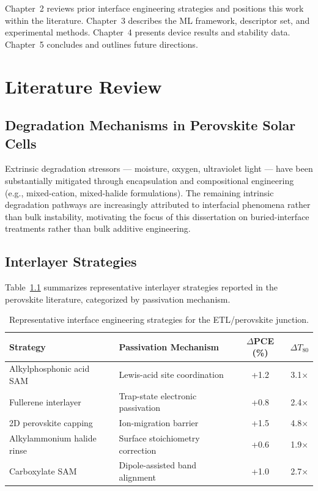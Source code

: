 \documentclass[12pt,a4paper,oneside]{report}
\begin{document}
Chapter~2 reviews prior interface engineering strategies and positions this
work within the literature. Chapter~3 describes the ML framework,
descriptor set, and experimental methods. Chapter~4 presents device results
and stability data. Chapter~5 concludes and outlines future directions.

\chapter{Literature Review}

\section{Degradation Mechanisms in Perovskite Solar Cells}

Extrinsic degradation stressors --- moisture, oxygen, ultraviolet light ---
have been substantially mitigated through encapsulation and compositional
engineering (e.g., mixed-cation, mixed-halide formulations). The remaining
intrinsic degradation pathways are increasingly attributed to interfacial
phenomena rather than bulk instability, motivating the focus of this
dissertation on buried-interface treatments rather than bulk additive
engineering.

\section{Interlayer Strategies}

Table~\ref{tab:literature} summarizes representative interlayer strategies
reported in the perovskite literature, categorized by passivation
mechanism.

\begin{table}[htbp]
\centering
\caption{Representative interface engineering strategies for the
ETL/perovskite junction.}
\label{tab:literature}
\begin{tabularx}{\linewidth}{@{}l X c c@{}}
\toprule
\textbf{Strategy} & \textbf{Passivation Mechanism} & \textbf{$\Delta$PCE (\%)} & \textbf{$\Delta T_{80}$} \\
\midrule
Alkylphosphonic acid SAM & Lewis-acid site coordination & +1.2 & 3.1$\times$ \\
Fullerene interlayer & Trap-state electronic passivation & +0.8 & 2.4$\times$ \\
2D perovskite capping & Ion-migration barrier & +1.5 & 4.8$\times$ \\
Alkylammonium halide rinse & Surface stoichiometry correction & +0.6 & 1.9$\times$ \\
Carboxylate SAM & Dipole-assisted band alignment & +1.0 & 2.7$\times$ \\
\bottomrule
\end{tabularx}
\end{table}
\end{document}

